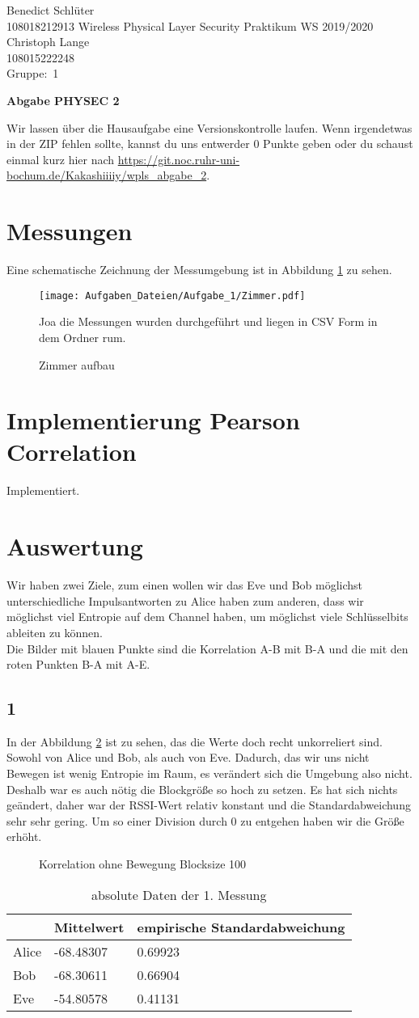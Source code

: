 \documentclass[12pt,a4paper]{article}
\newcommand{\student}{Benedict Schlüter\\ 108018212913 } %
\newcommand{\partner}{Christoph Lange\\ 108015222248} %
\newcommand{\group}{1} %
\newcommand{\hwheadtwo}{$ $
  \vspace{-2cm}
  
\noindent \student \qquad \qquad  Wireless Physical Layer Security Praktikum \hfill WS 2019/2020 \\
\noindent \partner \\
\noindent Gruppe:~\group\\
$ $

  
\begin{center}    
{\Large \bf Abgabe PHYSEC 2}
\end{center}
}
\begin{document}
\hwheadtwo
Wir lassen über die Hausaufgabe eine Versionskontrolle laufen. Wenn irgendetwas in der ZIP fehlen sollte, kannst du uns entwerder 0 Punkte geben oder du schaust einmal kurz hier nach \url{https://git.noc.ruhr-uni-bochum.de/Kakashiiiiy/wpls_abgabe_2}.
\section{Messungen}
Eine schematische Zeichnung der Messumgebung ist in Abbildung \ref{fig:1_1} zu sehen.
\begin{figure}[H]
\centering
\texttt{[image: Aufgaben\_Dateien/Aufgabe\_1/Zimmer.pdf]} 
\caption{Zimmer aufbau}
\label{fig:1_1}
Joa die Messungen wurden durchgeführt und liegen in CSV Form in dem Ordner rum.
\end{figure}
\section{Implementierung Pearson Correlation}
Implementiert.
\section{Auswertung}
Wir haben zwei Ziele, zum einen wollen wir das Eve und Bob möglichst unterschiedliche Impulsantworten zu Alice haben zum anderen, dass wir möglichst viel Entropie auf dem Channel haben, um möglichst viele Schlüsselbits ableiten zu können.\\
Die Bilder mit blauen Punkte sind die Korrelation A-B mit B-A und die mit den roten Punkten B-A mit A-E.
\subsection*{1}
In der Abbildung \ref{fig:1} ist zu sehen, das die Werte doch recht unkorreliert sind. Sowohl von Alice und Bob, als auch von Eve. Dadurch, das wir uns nicht Bewegen ist wenig Entropie im Raum, es verändert sich die Umgebung also nicht. Deshalb war es auch nötig die Blockgröße so hoch zu setzen. Es hat sich nichts geändert, daher war der RSSI-Wert relativ konstant und die Standardabweichung sehr sehr gering. Um so einer Division durch 0 zu entgehen haben wir die Größe erhöht.
\begin{figure}[H]
\centering
{} \qquad
{}
\caption{Korrelation ohne Bewegung Blocksize 100}
\label{fig:1}
\end{figure}
\begin{table}[H]
\centering
\begin{tabular}{l|l|l}
& Mittelwert & empirische Standardabweichung \\
\hline
Alice & -68.48307 & 0.69923 \\
\hline
Bob & -68.30611 & 0.66904 \\
\hline
Eve & -54.80578 & 0.41131 \\
\end{tabular}
\caption{absolute Daten der 1. Messung}
\end{table}
\end{document}
